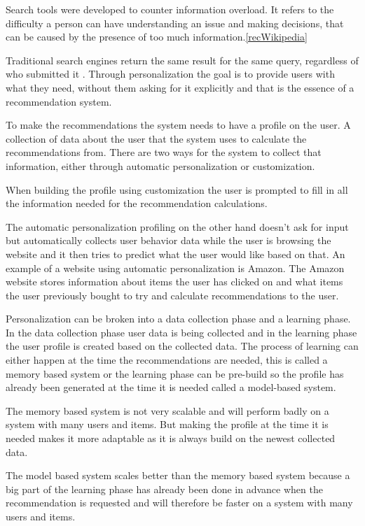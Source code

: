 Search tools were developed to counter information overload. It refers to the difficulty a person can have understanding an issue and making decisions, that can be caused by the presence of too much information.\ref{recWikipedia}

Traditional search engines return the same result for the same query, regardless of who submitted it \cite{TheAdaptiveWeb}. Through personalization the goal is to provide users with what they need, without them asking for it explicitly and that is the essence of a recommendation system.

To make the recommendations the system needs to have a profile on the user. A collection of data about the user that the system uses to calculate the recommendations from. There are two ways for the system to collect that information, either through automatic personalization or customization.

When building the profile using customization the user is prompted to fill in all the information needed for the recommendation calculations.

The automatic personalization profiling on the other hand doesn't ask for input but automatically collects user behavior data while the user is browsing the website and it then tries to predict what the user would like based on that. An example of a website using automatic personalization is Amazon. The Amazon website stores information about items the user has clicked on and what items the user previously bought to try and calculate recommendations to the user. 	
   
Personalization can be broken into a data collection phase and a learning phase. In the data collection phase user data is being collected and in the learning phase the user profile is created based on the collected data. The process of learning can either happen at the time the recommendations are needed, this is called a memory based system or the learning phase can be pre-build so the profile has already been generated at the time it is needed called a model-based system.	

The memory based system is not very scalable and will perform badly on a system with many users and items. But making the profile at the time it is needed makes it more adaptable as it is always build on the newest collected data.

The model based system scales better than the memory based system because a big part of the learning phase has already been done in advance when the recommendation is requested and will therefore be faster on a system with many users and items. 
